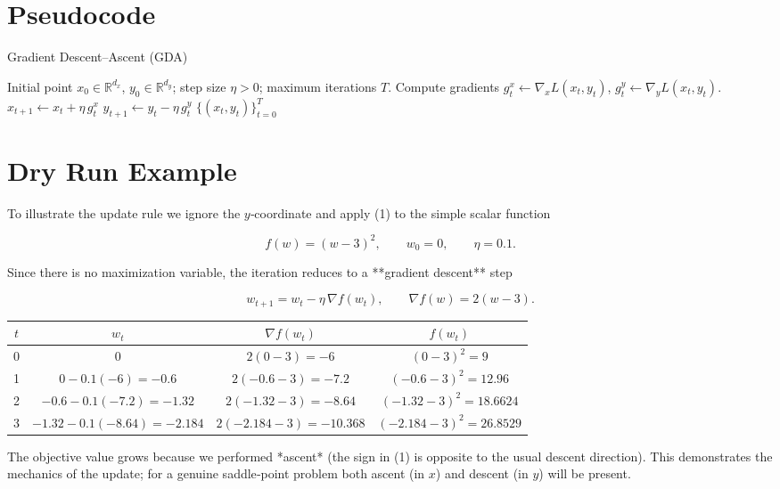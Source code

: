 \documentclass{article}
\begin{document}
\section*{Pseudocode}
\begin{algorithm}[H]
\caption{Gradient Descent–Ascent (GDA)}\label{alg:GDA}
\begin{algorithmic}[1]
\Require Initial point $x_{0}\in\mathbb{R}^{d_x}$, $y_{0}\in\mathbb{R}^{d_y}$; step size $\eta>0$; maximum iterations $T$.
    \State Compute gradients $g^{x}_{t}\gets \nabla_{x}L(x_{t},y_{t})$, $g^{y}_{t}\gets \nabla_{y}L(x_{t},y_{t})$.
    \State $x_{t+1}\gets x_{t}+ \eta\, g^{x}_{t}$ \hfill{}
    \State $y_{t+1}\gets y_{t}- \eta\, g^{y}_{t}$ \hfill{}
\EndFor
\State \Return $\{(x_{t},y_{t})\}_{t=0}^{T}$
\end{algorithmic}
\end{algorithm}

\section*{Dry Run Example}
To illustrate the update rule we ignore the $y$‑coordinate and apply (1) to the simple scalar function  

\[
f(w)= (w-3)^{2},\qquad w_{0}=0,\qquad \eta=0.1.
\]

Since there is no maximization variable, the iteration reduces to a **gradient descent** step  

\[
w_{t+1}=w_{t}-\eta\,\nabla f(w_{t}),\qquad 
\nabla f(w)=2(w-3).
\]

\begin{center}
\begin{tabular}{c|c|c|c}
$t$ & $w_{t}$ & $\nabla f(w_{t})$ & $f(w_{t})$\\\hline
0 & $0$ & $2(0-3)=-6$ & $(0-3)^{2}=9$\\
1 & $0-0.1(-6)= -0.6$ & $2(-0.6-3)=-7.2$ & $(-0.6-3)^{2}=12.96$\\
2 & $-0.6-0.1(-7.2)= -1.32$ & $2(-1.32-3)=-8.64$ & $(-1.32-3)^{2}=18.6624$\\
3 & $-1.32-0.1(-8.64)= -2.184$ & $2(-2.184-3)=-10.368$ & $(-2.184-3)^{2}=26.8529$
\end{tabular}
\end{center}

The objective value grows because we performed *ascent* (the sign in (1) is opposite to the usual descent direction).  This demonstrates the mechanics of the update; for a genuine saddle‑point problem both ascent (in $x$) and descent (in $y$) will be present.
\end{document}
